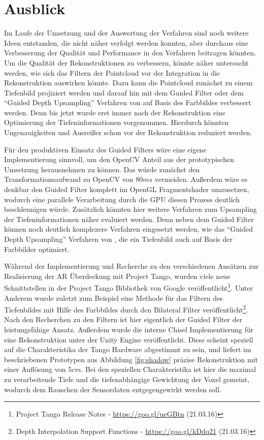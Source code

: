 \section{Ausblick}

Im Laufe der Umsetzung und der Auswertung der Verfahren sind noch weitere Ideen entstanden, die nicht näher verfolgt werden konnten, aber durchaus eine Verbesserung der Qualität und Performance in den Verfahren beitragen könnten. Um die Qualität der Rekonstruktionen zu verbessern, könnte näher untersucht werden, wie sich das Filtern der Pointcloud vor der Integration in die Rekonstruktion auswirken könnte. Dazu kann die Pointcloud zunächst zu einem Tiefenbild projiziert werden und darauf hin mit dem Guided Filter oder dem \enquote{Guided Depth Upsampling} Verfahren von \citet{Ferstl_2013_ICCV} auf Basis des Farbbildes verbessert werden. Denn bis jetzt wurde erst immer nach der Rekonstruktion eine Optimierung der Tiefeninformationen vorgenommen. Hierdurch könnten Ungenauigkeiten und Ausreißer schon vor der Rekonstruktion reduziert werden. 

Für den produktiven Einsatz des Guided Filters wäre eine eigene Implementierung sinnvoll, um den OpenCV Anteil aus der prototypischen Umsetzung herausnehmen zu können. Das würde zunächst den Transformationsaufwand zu OpenCV von \(80 ms\) vermeiden. Außerdem wäre es denkbar den Guided Filter komplett im OpenGL Fragmentshader umzusetzen, wodurch eine parallele Verarbeitung durch die GPU diesen Prozess deutlich beschleunigen würde. Zusätzlich könnten hier weitere Verfahren zum Upsampling der Tiefeninformationen näher evaluiert werden. Denn neben dem Guided Filter können noch deutlich komplexere Verfahren eingesetzt werden, wie das \enquote{Guided Depth Upsampling} Verfahren von \citet{Ferstl_2013_ICCV}, die ein Tiefenbild auch auf Basis der Farbbilder optimiert. 

Während der Implementierung und Recherche zu den verschiedenen Ansätzen zur Realisierung der AR Überdeckung mit Project Tango, wurden viele neue Schnittstellen in der Project Tango Bibliothek von Google veröffentlicht\footnote{Project Tango Release Notes - \url{https://goo.gl/ueGBtn} (21.03.16)}.  Unter Anderem wurde zuletzt zum Beispiel eine Methode für das Filtern des Tiefenbildes mit Hilfe des Farbbildes durch den Bilateral Filter veröffentlicht\footnote{Depth Interpolation Support Functions - \url{https://goo.gl/kDdq21} (21.03.16)}. Nach den Recherchen zu den Filtern ist hier eigentlich der Guided Filter der leistungsfähige Ansatz. Außerdem wurde die interne Chisel Implementierung für eine Rekonstruktion unter der Unity Engine veröffentlicht. Diese scheint speziell auf die Charakteristika der Tango Hardware abgestimmt zu sein, und liefert im beschriebenen Prototypen aus Abbildung \ref{fig:shadow} präzise Rekonstruktion mit einer Auflösung von \(5cm\). Bei den speziellen Charakteristika ist hier die maximal zu verarbeitende Tiefe und die tiefenabhängige Gewichtung der Voxel gemeint, wodurch dem Rauschen der Sensordaten entgegengewirkt werden soll.

